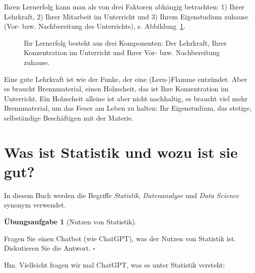 \documentclass[
  letterpaper,
]{scrbook}
\theoremstyle{definition}
\theoremstyle{definition}
\theoremstyle{definition}
\newtheorem{exercise}{Übungsaufgabe}[chapter]
\theoremstyle{remark}
\begin{document}
Ihren Lernerfolg kann man als von drei Faktoren abhängig betrachten: 1)
Ihrer Lehrkraft, 2) Ihrer Mitarbeit im Unterricht und 3) Ihrem
Eigenstudium zuhause (Vor- bzw. Nachbereitung des Unterrichts), s.
Abbildung~\ref{fig-erfolgsrezept}.

\begin{figure}


\caption{\label{fig-erfolgsrezept}Ihr Lernerfolg besteht aus drei
Komponenten: Der Lehrkraft, Ihrer Konzentration im Unterricht und Ihrer
Vor- bzw. Nachbereitung zuhause.}

\end{figure}%

Eine gute Lehrkraft ist wie der Funke, der eine (Lern-)Flamme entzündet.
Aber es braucht Brennmaterial, einen Holzscheit, das ist Ihre
Konzentration im Unterricht. Ein Holzscheit alleine ist aber nicht
nachhaltig, es braucht viel mehr Brennmaterial, um das Feuer am Leben zu
halten: Ihr Eigenstudium, das stetige, selbständige Beschäftigen mit der
Materie.

\section{Was ist Statistik und wozu ist sie
gut?}\label{was-ist-statistik-und-wozu-ist-sie-gut}

In diesem Buch werden die Begriffe \emph{Statistik}, \emph{Datenanalyse}
und \emph{Data Science} synonym verwendet.

\begin{exercise}[Nutzen von
Statistik]\protect\hypertarget{exr-nutzen-statistik}{}\label{exr-nutzen-statistik}

Fragen Sie einen Chatbot (wie ChatGPT), was der Nutzen von Statistik
ist. Diskutieren Sie die Antwort. \(\square\)

\end{exercise}

Hm. Vielleicht fragen wir mal ChatGPT, was es unter Statistik versteht:
\end{document}
